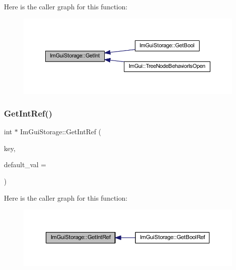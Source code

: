 Here is the caller graph for this function\+:
\nopagebreak
\begin{figure}[H]
\begin{center}
\leavevmode
\includegraphics[width=350pt]{struct_im_gui_storage_ac86b64f5c69a15de6c6c326963eca64a_icgraph}
\end{center}
\end{figure}
\mbox{\label{struct_im_gui_storage_a28673fa7839263f3066ccb8e93e748a9}} 
\subsubsection{\texorpdfstring{Get\+Int\+Ref()}{GetIntRef()}}
{\footnotesize\ttfamily int $\ast$ Im\+Gui\+Storage\+::\+Get\+Int\+Ref (\begin{DoxyParamCaption}\item[{\mbox{\hyperlink{imgui_8h_a1785c9b6f4e16406764a85f32582236f}{Im\+Gui\+ID}}}]{key,  }\item[{int}]{default\+\_\+val = {} }\end{DoxyParamCaption})}

Here is the caller graph for this function\+:
\nopagebreak
\begin{figure}[H]
\begin{center}
\leavevmode
\includegraphics[width=350pt]{struct_im_gui_storage_a28673fa7839263f3066ccb8e93e748a9_icgraph}
\end{center}
\end{figure}
\mbox{\label{struct_im_gui_storage_aaf87a98ede89da09113b0189f6d878ca}} 
